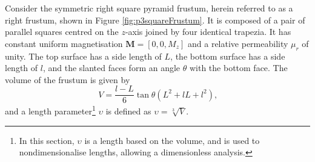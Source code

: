 Consider the symmetric right square pyramid frustum, herein referred to as a right frustum, shown in Figure \ref{fig:p3squareFrustum}. It is composed of a pair of parallel squares centred on the \(z\)-axis joined by four identical trapezia. It has constant uniform magnetisation \(\mathbf{M} = \left[ 0, 0, M_z \right]\) and a relative permeability \(\mu_r\) of unity. The top surface has a side length of \(L\), the bottom surface has a side length of \(l\), and the slanted faces form an angle \(\theta\) with the bottom face. The volume of the frustum is given by
\begin{equation}
V = \frac{l-L}{6}\tan\theta \left( L^2 + lL+ l^2 \right) \text{,}
\end{equation}
and a length parameter\footnote{In this section, \(\upsilon\) is a length based on the volume, and is used to nondimensionalise lengths, allowing a dimensionless analysis.} \(\upsilon\) is defined as \(\upsilon = \sqrt[3]{V}\).

